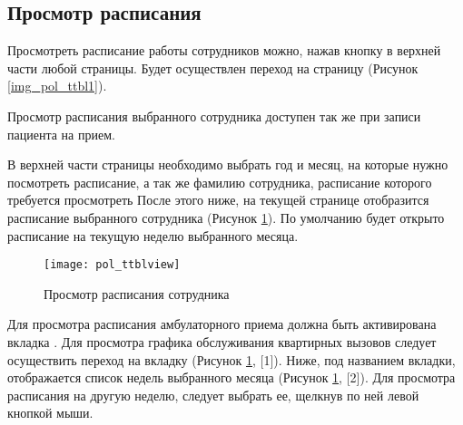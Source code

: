 \subsection{Просмотр расписания} \label{pol_ttbl_view}

Просмотреть расписание работы сотрудников можно, нажав кнопку  в верхней части любой страницы. Будет осуществлен переход на страницу  (Рисунок \ref{img_pol_ttbl1}).

\begin{prim}
 Просмотр расписания выбранного сотрудника доступен так же при записи пациента на прием.
\end{prim}

В верхней части страницы необходимо выбрать год и месяц, на которые нужно посмотреть расписание, а так же фамилию сотрудника, расписание которого требуется просмотреть  После этого ниже, на текущей  странице отобразится расписание выбранного сотрудника (Рисунок \ref{img_pol_ttblview}). По умолчанию будет открыто расписание на текущую неделю выбранного месяца. 

\begin{figure}[ht]\centering
 \texttt{[image: pol\_ttblview]}
 \caption{Просмотр расписания сотрудника}
 \label{img_pol_ttblview}
\end{figure}

Для просмотра расписания амбулаторного приема должна быть активирована вкладка . Для просмотра графика обслуживания квартирных вызовов следует осуществить переход на вкладку  (Рисунок \ref{img_pol_ttblview}, [1]). Ниже, под названием вкладки, отображается список недель выбранного месяца (Рисунок \ref{img_pol_ttblview}, [2]). Для просмотра расписания на другую неделю, следует выбрать ее, щелкнув по ней левой кнопкой мыши.

